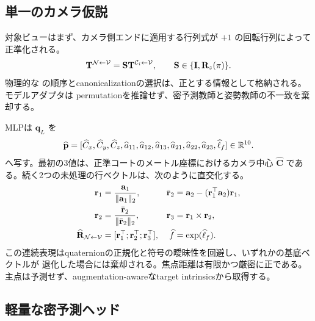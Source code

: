 \subsection{単一のカメラ仮説}
\label{sec:pose10d}

対象ビューはまず、カメラ側エンドに適用する行列式が $+1$ の回転行列によって正準化される。
\begin{equation}
  \mathbf{T}^{\mathcal{N}\leftarrow \mathcal{V}}=\mathbf{S}\mathbf{T}^{\mathcal{C}_i\leftarrow \mathcal{V}},
  \qquad \mathbf{S}\in\{\mathbf{I},\mathbf{R}_z(\pi)\}.
  \label{eq:canonical_pose}
\end{equation}
物理的な \KP の順序とcanonicalizationの選択は、正とする情報として格納される。モデルアダプタは
permutationを推論せず、密予測教師と姿勢教師の不一致を棄却する。

MLPは \(\mathbf{q}_L\) を
\begin{equation}
  \widehat{\mathbf{p}}=
  [\widehat C_x,\widehat C_y,\widehat C_z,
   \widehat a_{11},\widehat a_{12},\widehat a_{13},
   \widehat a_{21},\widehat a_{22},\widehat a_{23},
   \widehat\ell_f]\in\mathbb{R}^{10}.
  \label{eq:pose10d}
\end{equation}
へ写す。最初の3値は、正準コートのメートル座標におけるカメラ中心
\(\widehat{\mathbf{C}}\) である。続く2つの未処理の行ベクトルは、次のように直交化する。
\begin{align}
  \mathbf{r}_1&=\frac{\mathbf{a}_1}{\|\mathbf{a}_1\|_2}, &
  \bar{\mathbf{r}}_2&=\mathbf{a}_2-
      (\mathbf{r}_1^{\top}\mathbf{a}_2)\mathbf{r}_1, \\
  \mathbf{r}_2&=\frac{\bar{\mathbf{r}}_2}{\|\bar{\mathbf{r}}_2\|_2}, &
  \mathbf{r}_3&=\mathbf{r}_1\times\mathbf{r}_2, \\
  \widehat{\mathbf{R}}_{\mathcal{N}\leftarrow\mathcal{V}}
    &= [\mathbf{r}_1^{\top};\mathbf{r}_2^{\top};\mathbf{r}_3^{\top}], &
  \widehat f&=\exp(\widehat\ell_f).
  \label{eq:rotation_decode}
\end{align}
この連続表現はquaternionの正規化と符号の曖昧性を回避し、いずれかの基底ベクトルが
退化した場合には棄却される\citep{zhou2019continuity}。焦点距離は有限かつ厳密に正である。
主点は予測せず、augmentation-awareなtarget intrinsicsから取得する。

\subsection{軽量な密予測ヘッド}

